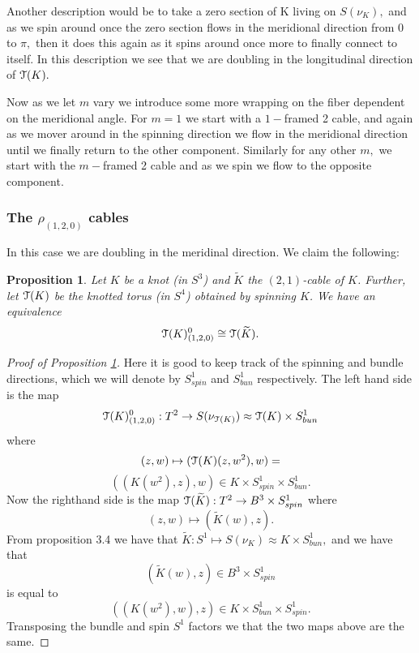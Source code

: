 \documentclass[a4paper, 12 pt, reqno]{amsart}
\newtheorem{prop}[theorem]{Proposition}
\theoremstyle{definition}
\theoremstyle{remark}
\begin{document}
Another description would be to take a zero section of K living on $S(\nu_{K}),$ and as we spin around once the zero section flows in the meridional direction from $0$ to $\pi,$ then it does this again as it spins around once more to finally connect to itself. In this description we see that we are doubling in the longitudinal direction of $\mathcal T(K).$


Now as we let $m$ vary we introduce some more wrapping on the fiber dependent on the meridional angle. For $m = 1$ we start with a $1-$framed 2 cable, and again as we mover around in the spinning direction we flow in the meridional direction until we finally return to the other component. Similarly for any other $m,$ we start with the $m-$framed 2 cable and as we spin we flow to the opposite component.
 
\subsubsection{The $\rho_{(1,2,0)}$ cables} In this case we are doubling in the meridinal direction. We claim the following:

\begin{prop}\label{prop:commute}
Let $K$ be a knot (in $S^3$) and $\widetilde{K}$ the $(2, 1)$-cable of $K$.  Further, let $\mathcal T (K)$ be the knotted torus (in $S^4$) obtained by spinning $K$. We have an equivalence
\[
 \mathcal T(K)_{(1,2,0)}^{0} \cong \mathcal T (\widetilde{K}).
\]
\end{prop}

\begin{proof}[Proof of Proposition \ref{prop:commute}]
Here it is good to keep track of the spinning and bundle directions, which we will denote by $S^{1}_{spin}$ and $S^{1}_{bun}$ respectively. The left hand side is the map $$\mathcal T(K)^{0}_{(1, 2, 0)}: T^{2} \rightarrow S(\nu_{\mathcal T(K)}) \approx \mathcal T(K) \times S^{1}_{bun}$$ where $$(z, w) \mapsto (\mathcal T(K)(z, w^{2}), w) =$$ $$((K(w^{2}), z), w) \in K \times S^{1}_{spin} \times S^{1}_{bun}.$$
Now the righthand side is the map $\mathcal T(\widetilde{K}): T^{2} \rightarrow B^{3} \times S^{1}_{spin}$ where $$(z, w) \mapsto (\widetilde{K}(w), z).$$ From proposition 3.4 we have that $\widetilde{K}: S^{1} \mapsto S(\nu_{K}) \approx K \times S^{1}_{bun},$ and we have that $$(\widetilde{K}(w), z) \in B^{3} \times S^{1}_{spin}$$ is equal to  $$((K(w^{2}), w), z) \in K \times S^{1}_{bun} \times S^{1}_{spin}.$$ Transposing the bundle and spin $S^{1}$ factors we that the two maps above are the same.
\end{proof}
\end{document}
